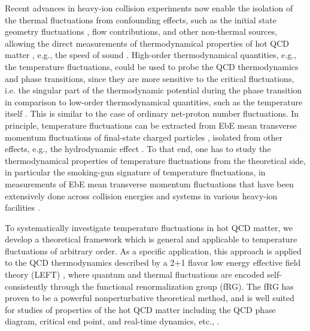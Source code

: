 \documentclass[aps,twocolumn,prd,superscriptaddress,nofootinbib,floatfix]{revtex4-2}
\begin{document}
Recent advances in heavy-ion collision experiments now enable the isolation of the thermal fluctuations from confounding effects, such as the initial state geometry fluctuations \cite{Gardim:2011xv, Schenke:2014tga, STAR:2024wgy, ATLAS:2024jvf, Zhang:2025yyd}, flow contributions, and other non-thermal sources, allowing the direct measurements of thermodynamical properties of hot QCD matter \cite{Gardim:2019xjs}, e.g., the speed of sound \cite{Gardim:2019brr, Gardim:2024zvi, CMS:2024sgx, Mu:2025gtr}. High-order thermodynamical quantities, e.g., the temperature fluctuations, could be used to probe the QCD thermodynamics and phase transitions, since they are more sensitive to the critical fluctuations, i.e. the singular part of the thermodynamic potential during the phase transition in comparison to low-order thermodynamical quantities, such as the temperature itself \cite{NA60:2008dcb, HADES:2019auv, Churchill:2023zkk, STAR:2024bpc}. This is similar to the case of ordinary net-proton number fluctuations. In principle, temperature fluctuations can be extracted from EbE mean transverse momentum fluctuations of final-state charged particles \cite{Gavin:2003cb}, isolated from other effects, e.g., the hydrodynamic effect \cite{Giacalone:2020lbm}. To that end, one has to study the thermodynamical properties of temperature fluctuations from the theoretical side, in particular the smoking-gun signature of temperature fluctuations, in measurements of EbE mean transverse momentum fluctuations that have been extensively done across collision energies and systems in various heavy-ion facilities \cite{NA49:1999inh, CERES:2003sap, PHENIX:2003ccl, STAR:2005vxr, NA49:2008fag, ALICE:2023tej, ATLAS:2024jvf}. 
 
To systematically investigate temperature fluctuations in hot QCD matter, we develop a theoretical framework which is general and applicable to temperature fluctuations of arbitrary order. As a specific application, this approach is applied to the QCD thermodynamics described by a 2+1 flavor low energy effective field theory (LEFT) \cite{Wen:2018nkn}, where quantum and thermal fluctuations are encoded self-consistently through the functional renormalization group (fRG). The fRG has proven to be a powerful nonperturbative theoretical method, and is well suited for  studies of properties of the hot QCD matter including the QCD phase diagram, critical end point, and real-time dynamics, etc., \cite{Fu:2019hdw, Braun:2020ada, Braun:2023qak, Tan:2024fuq, Fu:2024rto, Dupuis:2020fhh, Fu:2022gou}.
\end{document}

